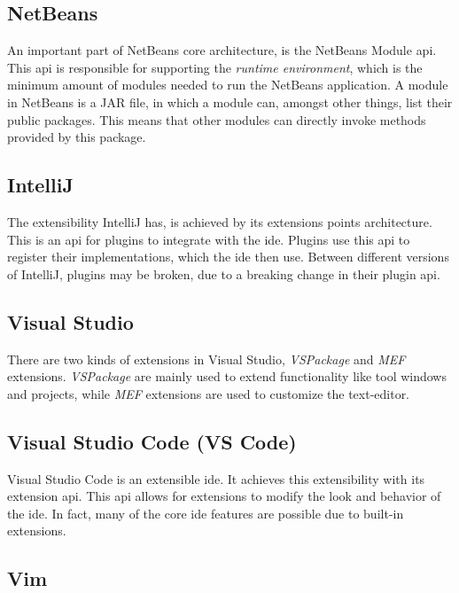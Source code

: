 \subsection{NetBeans}

An important part of NetBeans core architecture, is the NetBeans Module
\gls*{api}. This \gls{api} is responsible for supporting the
\textit{runtime environment}, which is the minimum amount of modules needed to
run the NetBeans application. A module in NetBeans is a JAR file, in which a
module can, amongst other things, list their public packages. This means that
other modules can directly invoke methods provided by this package.


\subsection{IntelliJ}

The extensibility IntelliJ has, is achieved by its extensions points
architecture. This is an \gls*{api} for plugins to integrate with the
\gls*{ide}. Plugins use this \gls*{api} to register their implementations, which
the \gls*{ide} then use. Between different versions of IntelliJ, plugins may be
broken, due to a breaking change in their plugin \gls*{api}.


\subsection{Visual Studio}

There are two kinds of extensions in Visual Studio, \textit{VSPackage} and
\textit{MEF} extensions. \textit{VSPackage} are mainly used to extend
functionality like tool windows and projects, while \textit{MEF} extensions are
used to customize the text-editor.


\subsection{Visual Studio Code (VS Code)}

Visual Studio Code is an extensible \gls*{ide}. It achieves this extensibility
with its extension \gls*{api}. This \gls*{api} allows for extensions to modify
the look and behavior of the \gls*{ide}. In fact, many of the core \gls*{ide}
features are possible due to built-in extensions.


\subsection{Vim}

